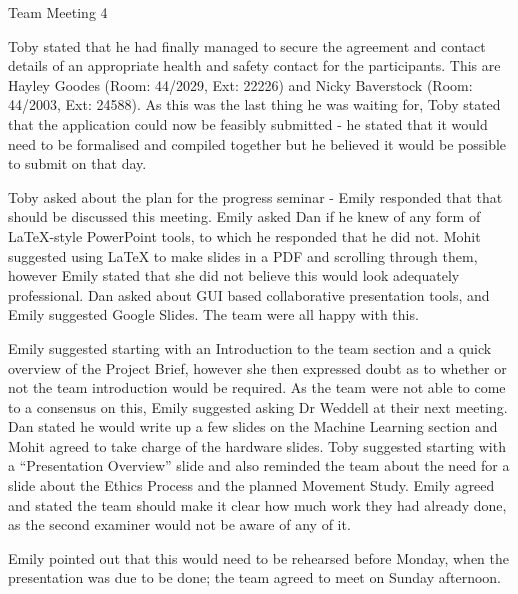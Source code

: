 \documentclass{article}
\begin{document}
\begin{Minutes}{Team Meeting 4}

Toby stated that he had finally managed to secure the agreement and contact details of an appropriate health and safety contact for the participants. This are Hayley Goodes (Room: 44/2029, Ext: 22226) and Nicky Baverstock (Room: 44/2003, Ext: 24588).
As this was the last thing he was waiting for, Toby stated that the application could now be feasibly submitted - he stated that it would need to be formalised and compiled together but he believed it would be possible to submit on that day.


Toby asked about the plan for the progress seminar - Emily responded that that should be discussed this meeting.
Emily asked Dan if he knew of any form of LaTeX-style PowerPoint tools, to which he responded that he did not. Mohit suggested using LaTeX to make slides in a PDF and scrolling through them, however Emily stated that she did not believe this would look adequately professional.
Dan asked about GUI based collaborative presentation tools, and Emily suggested Google Slides. The team were all happy with this.

Emily suggested starting with an Introduction to the team section and a quick overview of the Project Brief, however she then expressed doubt as to whether or not the team introduction would be required. As the team were not able to come to a consensus on this, Emily suggested asking Dr Weddell at their next meeting.
Dan stated he would write up a few slides on the Machine Learning section and Mohit agreed to take charge of the hardware slides. Toby suggested starting with a ``Presentation Overview'' slide and also reminded the team about the need for a slide about the Ethics Process and the planned Movement Study. Emily agreed and stated the team should make it clear how much work they had already done, as the second examiner would not be aware of any of it.

Emily pointed out that this would need to be rehearsed before Monday, when the presentation was due to be done; the team agreed to meet on Sunday afternoon. 



\end{Minutes}
\end{document}
